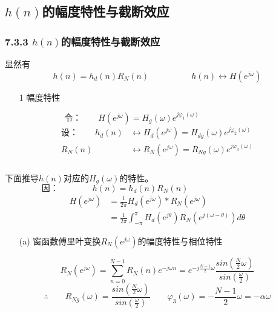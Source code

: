 \documentclass[notheorems,compress,mathserif,table]{beamer}
\begin{document}
\subsection{$h(n)$的幅度特性与截断效应}
\begin{frame}\frametitle{7.3.3 $h(n)$的幅度特性与截断效应}%


    显然有
    $$h(n) = h_d(n)R_N(n) \quad\quad\quad\quad\quad   h(n)\longleftrightarrow H(e^{j\omega})$$
\begin{enumerate}
  \item [1] 幅度特性
\end{enumerate}
    $$\mbox{令：}\quad\quad H(e^{j\omega})   = H_g(\omega)e^{j\varphi_1(\omega)}\quad\quad\quad\quad
    \quad\quad$$
    \begin{equation*}
    \begin{split}
    \mbox{设：}\quad\quad
        h_d(n)  &\longleftrightarrow H_d(e^{j\omega}) = H_{dg}(\omega)e^{j\varphi_2(\omega)}\\
        R_N(n)  &\longleftrightarrow R_N(e^{j\omega}) =R_{Ng}(\omega)e^{j\varphi_3(\omega)}
    \end{split}
    \end{equation*}
\end{frame}


\begin{frame}\frametitle{}%

    下面推导$h(n)$对应的$H_g(\omega)$的特性。
    $$\mbox{因：}\quad\quad\quad\quad h(n) = h_d(n)R_N(n) \quad\quad\quad\quad\quad\quad\quad\quad\quad\quad$$
    \begin{equation*}
        \begin{split}
        H(e^{j\omega})
          &=\frac{1}{2\pi}H_d(e^{j\omega})\ast R_N(e^{j\omega})\\
          &=\frac{1}{2\pi}\int_{-\pi}^{\pi}H_d(e^{j\theta})R_N(e^{j(\omega -\theta)})d\theta
        \end{split}
      \end{equation*}
    \begin{itemize}
      \item[(a)] 窗函数傅里叶变换$R_N(e^{j\omega})$的幅度特性与相位特性
    \end{itemize}
        $$R_N(e^{j\omega}) = \sum_{n=0}^{N-1}R_N(n)e^{-j\omega n}= e^{-j\frac{N-1}{2}\omega}
        \frac{sin(\frac{N}{2}\omega)}{sin(\frac{\omega}{2})}$$
        $$\therefore\quad\quad
        R_{Ng}(\omega) = \frac{sin(\frac{N}{2}\omega)}{sin(\frac{\omega}{2})}\quad\quad
        \varphi_3(\omega) = -\frac{N-1}{2}\omega = -\alpha\omega$$
\end{frame}
\end{document}
